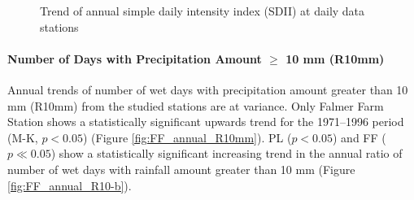 \begin{figure}[htbp]

  \caption{Trend of annual simple daily intensity index (SDII) at daily
data stations}
  \label{fig:FF_annual_SDII}
\end{figure}

\paragraph{Number of Days with Precipitation Amount $\geq$ 10 mm (R10mm)}
\label{sec:R10}
Annual trends of number of wet days with precipitation amount greater than 10 mm
(R10mm) from the studied stations are at variance. Only Falmer Farm Station
shows a statistically significant upwards trend for the 1971--1996 period (M-K,
$p<0.05$) (Figure \ref{fig:FF_annual_R10mm}). PL ($p < 0.05$) and FF ($p \ll
0.05$) show a statistically significant increasing trend in the annual ratio of
number of wet days with rainfall amount greater than 10 mm (Figure
\ref{fig:FF_annual_R10-b}).

